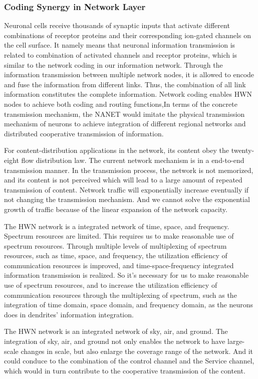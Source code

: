 \documentclass[journal,comsoc]{IEEEtran}
\begin{document}
			\subsubsection{Coding Synergy in Network Layer}
				Neuronal cells receive thousands of synaptic inputs that activate different combinations of receptor proteins and their corresponding ion-gated channels on the cell surface.
				It namely means that neuronal information transmission is related to combination of activated channels and receptor proteins, which is similar to the network coding in our information network. 
				Through the information transmission between multiple network nodes, it is allowed to encode and fuse the information from different links. 
				Thus, the combination of all link information constitutes the complete information.
				Network coding enables HWN nodes to achieve both coding and routing functions,In terms of the concrete transmission mechanism, the NANET would imitate the physical transmission mechanism of neurons 
				to achieve integration of different regional networks and distributed cooperative transmission of information.
				
				For content-distribution applications in the network, its content obey the twenty-eight flow distribution law.
				The current network mechanism is in a end-to-end transmission manner. 
				In the transmission process, the network is not memorized, and its content is not perceived which will lead to a large amount of repeated transmission of content.
				Network traffic will exponentially increase eventually if not changing the transmission mechanism. 
				And we cannot solve the exponential growth of traffic because of the linear expansion of the network capacity.
				
				The HWN network is a integrated network of time, space, and frequency.
				Spectrum resources are limited. This requires us to make reasonable use of spectrum resources.
				Through multiple levels of multiplexing of spectrum resources, such as time, space, and frequency, the utilization efficiency of communication resources is improved, and time-space-frequency integrated information transmission is realized.
				So it's necessary for us to make reasonable use of spectrum resources, and to increase the utilization efficiency of communication resources through the multiplexing of spectrum, such as the integration of time domain, space domain, and frequency domain, as the neurons does in dendrites' information integration.
				
				The HWN network is an integrated network of sky, air, and ground. 
				The integration of sky, air, and ground not only enables the network to have large-scale changes in scale,
				but also enlarge the coverage range of the network.
				And it could conduce to the combination of the control channel and the Service channel, which would in turn contribute to the cooperative transmission of the content.
				
\end{document}
